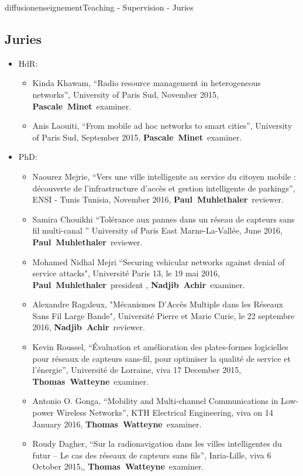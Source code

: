 \documentclass{ra2016}
\newcommand{\paul}  {\textbf{Paul~Muhlethaler}}
\newcommand{\pascale} {\textbf{Pascale~Minet}}
\newcommand{\thomas}  {\textbf{Thomas~Watteyne}}
\newcommand{\achir}  {\textbf{Nadjib~Achir}}
\begin{document}
\begin{module}{diffusion}{enseignement}{Teaching - Supervision - Juries}
\subsection {Juries}
\begin{itemize}
    \item HdR: 
        \begin{itemize}
            \item Kinda Khawam, ``Radio resource management in heterogeneous networks'', University of Paris Sud, November 2015, \pascale~examiner.
            \item Anis Laouiti, ``From mobile ad hoc networks to smart cities'', University of Paris Sud, September 2015, \pascale~examiner.
        \end{itemize} 
    \item PhD: 
        \begin{itemize}
           \item Naourez Mejrie, ``Vers une ville intelligente au service du citoyen mobile : découverte de l’infrastructure d’accès et gestion intelligente de parkings'', ENSI - Tunis Tunisia, November 2016, \paul~reviewer.
             \item   Samira Chouikhi  ``Tolérance aux pannes dans un réseau de capteurs sans fil multi-canal '' University of Paris East Marne-La-Vall\'ee,  June 2016, \paul~reviewer.
             \item Mohamed Nidhal Mejri ``Securing vehicular networks against denial of service attacks", Université Paris 13, le 19 mai 2016,  \paul~president ,  \achir~examiner.
             \item   Alexandre Ragaleux, "Mécanismes D’Accès Multiple dans les Réseaux Sans Fil Large Bande", Université Pierre et Marie Curie, le 22 septembre 2016,  \achir~reviewer.  
            \item Kevin Roussel, ``\'Evaluation et am\'elioration des plates-formes logicielles pour r\'eseaux de capteurs sans-fil, pour optimiser la qualit\'e de service et l'\'energie'', Universit\'e de Lorraine, viva 17 December 2015, \thomas~examiner.
            \item Antonio O. Gonga, ``Mobility and Multi-channel Communications in Low-power Wireless Networks'', KTH Electrical Engineering, viva on 14 January 2016, \thomas~examiner.
            \item Roudy Dagher, ``Sur la radionavigation dans les villes intelligentes du futur – Le cas des r\'eseaux de capteurs sans fils'', Inria-Lille, viva  6 October 2015,, \thomas~examiner.

\end{itemize}
\end{itemize}
\end{module}
\end{document}
